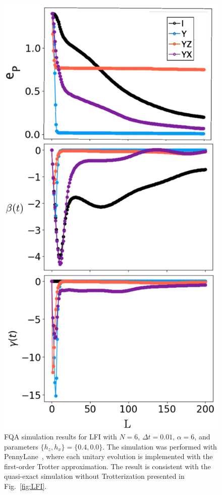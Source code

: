 \documentclass[twocolumn,aps,superscriptaddress,floatfix,longbibliography]{revtex4-2}
\begin{document}
\begin{figure}[h!]
    \centering
    \includegraphics[width=0.8\linewidth]{pennylane_vf.pdf} %
    \caption{FQA simulation results for LFI with $N=6$, $\Delta t = 0.01$, $\alpha=6$, and parameters $\{h_z,h_x\} = \{0.4,0.0\}$. The simulation was performed with PennyLane~\cite{bergholm2018pennylane}, where each unitary evolution is implemented with the first-order Trotter approximation. The result is consistent with the quasi-exact simulation without Trotterization presented in Fig.~\ref{fig:LFI}.}
    \label{fig:PLLFI}
\end{figure}
\end{document}

